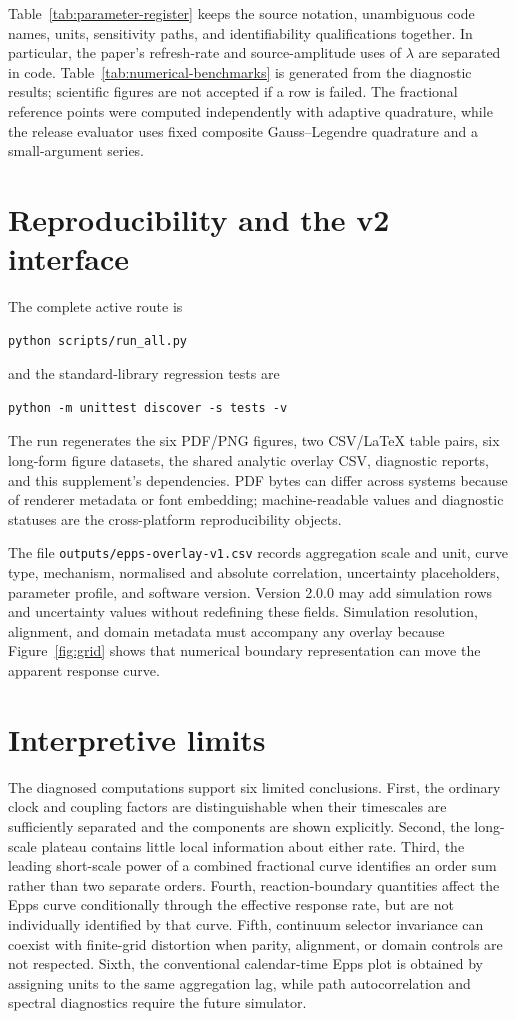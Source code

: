 \documentclass[11pt]{article}
\begin{document}
Table~\ref{tab:parameter-register} keeps the source notation, unambiguous code names, units, sensitivity paths, and identifiability qualifications together. In particular, the paper's refresh-rate and source-amplitude uses of \(\lambda\) are separated in code. Table~\ref{tab:numerical-benchmarks} is generated from the diagnostic results; scientific figures are not accepted if a row is failed. The fractional reference points were computed independently with adaptive quadrature, while the release evaluator uses fixed composite Gauss--Legendre quadrature and a small-argument series.

\section{Reproducibility and the v2 interface}

The complete active route is
\begin{verbatim}
python scripts/run_all.py
\end{verbatim}
and the standard-library regression tests are
\begin{verbatim}
python -m unittest discover -s tests -v
\end{verbatim}
The run regenerates the six PDF/PNG figures, two CSV/LaTeX table pairs, six long-form figure datasets, the shared analytic overlay CSV, diagnostic reports, and this supplement's dependencies. PDF bytes can differ across systems because of renderer metadata or font embedding; machine-readable values and diagnostic statuses are the cross-platform reproducibility objects.

The file \texttt{outputs/epps-overlay-v1.csv} records aggregation scale and unit, curve type, mechanism, normalised and absolute correlation, uncertainty placeholders, parameter profile, and software version. Version 2.0.0 may add simulation rows and uncertainty values without redefining these fields. Simulation resolution, alignment, and domain metadata must accompany any overlay because Figure~\ref{fig:grid} shows that numerical boundary representation can move the apparent response curve.

\section{Interpretive limits}

The diagnosed computations support six limited conclusions. First, the ordinary clock and coupling factors are distinguishable when their timescales are sufficiently separated and the components are shown explicitly. Second, the long-scale plateau contains little local information about either rate. Third, the leading short-scale power of a combined fractional curve identifies an order sum rather than two separate orders. Fourth, reaction-boundary quantities affect the Epps curve conditionally through the effective response rate, but are not individually identified by that curve. Fifth, continuum selector invariance can coexist with finite-grid distortion when parity, alignment, or domain controls are not respected. Sixth, the conventional calendar-time Epps plot is obtained by assigning units to the same aggregation lag, while path autocorrelation and spectral diagnostics require the future simulator.
\end{document}
